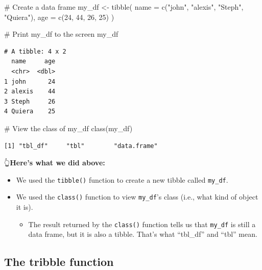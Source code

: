 \documentclass[
  letterpaper,
  DIV=11,
  numbers=noendperiod]{scrreprt}
\newenvironment{Shaded}{\begin{snugshade}}{\end{snugshade}}
\newcommand{\AttributeTok}[1]{\textcolor[rgb]{0.40,0.45,0.13}{#1}}
\newcommand{\CommentTok}[1]{\textcolor[rgb]{0.37,0.37,0.37}{#1}}
\newcommand{\DecValTok}[1]{\textcolor[rgb]{0.68,0.00,0.00}{#1}}
\newcommand{\FunctionTok}[1]{\textcolor[rgb]{0.28,0.35,0.67}{#1}}
\newcommand{\NormalTok}[1]{\textcolor[rgb]{0.00,0.23,0.31}{#1}}
\newcommand{\OtherTok}[1]{\textcolor[rgb]{0.00,0.23,0.31}{#1}}
\newcommand{\StringTok}[1]{\textcolor[rgb]{0.13,0.47,0.30}{#1}}
\providecommand{\tightlist}{%
  \setlength{\itemsep}{0pt}\setlength{\parskip}{0pt}}\usepackage{longtable,booktabs,array}
\begin{document}
\begin{Shaded}
\begin{Highlighting}[]
\CommentTok{\# Create a data frame}
\NormalTok{my\_df }\OtherTok{\textless{}{-}} \FunctionTok{tibble}\NormalTok{(}
  \AttributeTok{name =} \FunctionTok{c}\NormalTok{(}\StringTok{"john"}\NormalTok{, }\StringTok{"alexis"}\NormalTok{, }\StringTok{"Steph"}\NormalTok{, }\StringTok{"Quiera"}\NormalTok{),}
  \AttributeTok{age  =} \FunctionTok{c}\NormalTok{(}\DecValTok{24}\NormalTok{, }\DecValTok{44}\NormalTok{, }\DecValTok{26}\NormalTok{, }\DecValTok{25}\NormalTok{)}
\NormalTok{)}

\CommentTok{\# Print my\_df to the screen}
\NormalTok{my\_df}
\end{Highlighting}
\end{Shaded}

\begin{verbatim}
# A tibble: 4 x 2
  name     age
  <chr>  <dbl>
1 john      24
2 alexis    44
3 Steph     26
4 Quiera    25
\end{verbatim}

\begin{Shaded}
\begin{Highlighting}[]
\CommentTok{\# View the class of my\_df}
\FunctionTok{class}\NormalTok{(my\_df)}
\end{Highlighting}
\end{Shaded}

\begin{verbatim}
[1] "tbl_df"     "tbl"        "data.frame"
\end{verbatim}

👆\textbf{Here's what we did above:}

\begin{itemize}
\item
  We used the \texttt{tibble()} function to create a new tibble called
  \texttt{my\_df}.
\item
  We used the \texttt{class()} function to view \texttt{my\_df}'s class
  (i.e., what kind of object it is).

  \begin{itemize}
  \tightlist
  \item
    The result returned by the \texttt{class()} function tells us that
    \texttt{my\_df} is still a data frame, but it is also a tibble.
    That's what ``tbl\_df'' and ``tbl'' mean.
  \end{itemize}
\end{itemize}

\subsection{The tribble function}\label{the-tribble-function}
\end{document}
